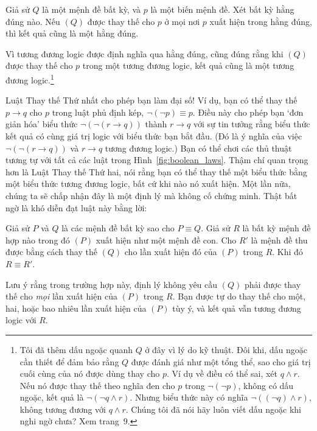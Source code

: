\begin{theorem}
Giả sử $Q$ là một mệnh đề bất kỳ, và $p$ là một biến mệnh đề. Xét bất kỳ hằng đúng nào. Nếu $(Q)$ được thay thế cho $p$ ở mọi nơi $p$ xuất hiện trong hằng đúng, thì kết quả cũng là một hằng đúng.
\end{theorem}

Vì tương đương logic được định nghĩa qua hằng đúng, cũng đúng rằng khi $(Q)$ được thay thế cho $p$ trong một tương đương logic, kết quả cũng là một tương đương logic.\footnote{Tôi đã thêm dấu ngoặc quanh $Q$ ở đây vì lý do kỹ thuật. Đôi khi, dấu ngoặc cần thiết để đảm bảo rằng $Q$ được đánh giá như một tổng thể, sao cho giá trị cuối cùng của nó được dùng thay cho $p$. Ví dụ về điều có thể sai, xét $q \land r$. Nếu nó được thay thế theo nghĩa đen cho $p$ trong $\lnot(\lnot p)$, không có dấu ngoặc, kết quả là $\lnot(\lnot q \land r)$. Nhưng biểu thức này có nghĩa $\lnot((\lnot q) \land r)$, không tương đương với $q \land r$. Chúng tôi đã nói hãy luôn viết dấu ngoặc khi nghi ngờ chưa? Xem trang~9.}

Luật Thay thế Thứ nhất cho phép bạn làm đại số! Ví dụ, bạn có thể thay thế $p \to q$ cho $p$ trong luật phủ định kép, $\lnot(\lnot p) \equiv p$. Điều này cho phép bạn `đơn giản hóa' biểu thức $\lnot(\lnot(r \to q))$ thành $r \to q$ với sự tin tưởng rằng biểu thức kết quả có cùng giá trị logic với biểu thức bạn bắt đầu. (Đó là ý nghĩa của việc $\lnot(\lnot(r \to q))$ và $r \to q$ tương đương logic.) Bạn có thể chơi các thủ thuật tương tự với tất cả các luật trong Hình~\ref{fig:boolean_laws}. Thậm chí quan trọng hơn là Luật Thay thế Thứ hai, nói rằng bạn có thể thay thế một biểu thức bằng một biểu thức tương đương logic, bất cứ khi nào nó xuất hiện. Một lần nữa, chúng ta sẽ chấp nhận đây là một định lý mà không cố chứng minh. Thật bất ngờ là khó diễn đạt luật này bằng lời:

\begin{theorem}
Giả sử $P$ và $Q$ là các mệnh đề bất kỳ sao cho $P \equiv Q$. Giả sử $R$ là bất kỳ mệnh đề hợp nào trong đó $(P)$ xuất hiện như một mệnh đề con. Cho $R'$ là mệnh đề thu được bằng cách thay thế $(Q)$ cho lần xuất hiện đó của $(P)$ trong $R$. Khi đó $R \equiv R'$.
\end{theorem}

Lưu ý rằng trong trường hợp này, định lý không yêu cầu $(Q)$ phải được thay thế cho \emph{mọi} lần xuất hiện của $(P)$ trong $R$. Bạn được tự do thay thế cho một, hai, hoặc bao nhiêu lần xuất hiện của $(P)$ tùy ý, và kết quả vẫn tương đương logic với $R$.

